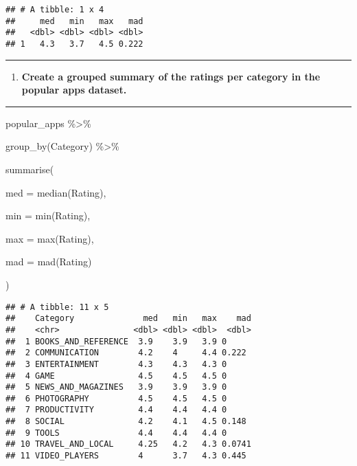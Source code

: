 \documentclass[
]{article}
\newenvironment{Shaded}{\begin{snugshade}}{\end{snugshade}}
\newcommand{\AttributeTok}[1]{\textcolor[rgb]{0.77,0.63,0.00}{#1}}
\newcommand{\FunctionTok}[1]{\textcolor[rgb]{0.00,0.00,0.00}{#1}}
\newcommand{\NormalTok}[1]{#1}
\newcommand{\SpecialCharTok}[1]{\textcolor[rgb]{0.00,0.00,0.00}{#1}}
\providecommand{\tightlist}{%
  \setlength{\itemsep}{0pt}\setlength{\parskip}{0pt}}
\begin{document}
\begin{verbatim}
## # A tibble: 1 x 4
##     med   min   max   mad
##   <dbl> <dbl> <dbl> <dbl>
## 1   4.3   3.7   4.5 0.222
\end{verbatim}

\begin{center}\rule{0.5\linewidth}{0.5pt}\end{center}

\begin{enumerate}
\def\labelenumi{\arabic{enumi}.}
\setcounter{enumi}{18}
\tightlist
\item
  \textbf{Create a grouped summary of the ratings per category in the
  popular apps dataset.}
\end{enumerate}

\begin{center}\rule{0.5\linewidth}{0.5pt}\end{center}

\begin{Shaded}
\begin{Highlighting}[]
\NormalTok{    popular\_apps }\SpecialCharTok{\%\textgreater{}\%}

      \FunctionTok{group\_by}\NormalTok{(Category) }\SpecialCharTok{\%\textgreater{}\%}

      \FunctionTok{summarise}\NormalTok{(}

        \AttributeTok{med =} \FunctionTok{median}\NormalTok{(Rating),}

        \AttributeTok{min =} \FunctionTok{min}\NormalTok{(Rating),}

        \AttributeTok{max =} \FunctionTok{max}\NormalTok{(Rating),}

        \AttributeTok{mad =} \FunctionTok{mad}\NormalTok{(Rating)}

\NormalTok{      )}
\end{Highlighting}
\end{Shaded}

\begin{verbatim}
## # A tibble: 11 x 5
##    Category              med   min   max    mad
##    <chr>               <dbl> <dbl> <dbl>  <dbl>
##  1 BOOKS_AND_REFERENCE  3.9    3.9   3.9 0     
##  2 COMMUNICATION        4.2    4     4.4 0.222 
##  3 ENTERTAINMENT        4.3    4.3   4.3 0     
##  4 GAME                 4.5    4.5   4.5 0     
##  5 NEWS_AND_MAGAZINES   3.9    3.9   3.9 0     
##  6 PHOTOGRAPHY          4.5    4.5   4.5 0     
##  7 PRODUCTIVITY         4.4    4.4   4.4 0     
##  8 SOCIAL               4.2    4.1   4.5 0.148 
##  9 TOOLS                4.4    4.4   4.4 0     
## 10 TRAVEL_AND_LOCAL     4.25   4.2   4.3 0.0741
## 11 VIDEO_PLAYERS        4      3.7   4.3 0.445
\end{verbatim}
\end{document}
